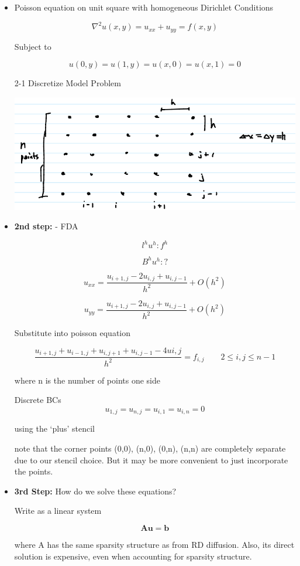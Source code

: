 \begin{itemize}
    \item Poisson equation on unit square with homogeneous Dirichlet Conditions

    \[\nabla ^2 u(x,y) = u_{xx} + u_{yy} = f(x,y) \]

    Subject to 

    \[ u(0,y) = u(1,y) = u(x,0) = u(x,1) = 0\]

    2-1 Discretize Model Problem

    \includegraphics[width = 0.5\linewidth]{Images/model_problem_grid.png}

    \item \textbf{2nd step: }- FDA

    \[ l^h u^h : f^h\]

    \[ B^hu^h: ?\]

    \[ u_{xx} = \frac{u_{i+1,j}-2u_{i,j}+u_{i,j-1}}{h^2} + O(h^2)\]

    \[ u_{yy} = \frac{u_{i+1,j}-2u_{i,j}+u_{i,j-1}}{h^2} + O(h^2)\]

    Substitute into poisson equation

    \[ \frac{u_{i+1,j}+u_{i-1,j}+u_{i,j+1}+u_{i,j-1}-4u{i,j}}{h^2} = f_{i,j} \qquad 2\le i,j\le n-1\]

    where n is the number of points one side

    Discrete BCs
    \[u_{1,j} = u_{n,j} = u_{i,1} = u_{i,n} = 0\]

    using the `plus' stencil

    note that the corner points (0,0), (n,0), (0,n), (n,n) are completely separate due to our stencil choice. But it may be more convenient to just incorporate the points.


    \item \textbf{3rd Step:} How do we solve these equations?

    Write as a linear system

    \[ \mathbf{A} \mathbf{u} = \mathbf{b}\]

    where A has the same sparsity structure as from RD diffusion. Also, its direct solution is expensive, even when accounting for sparsity structure.


\end{itemize}
